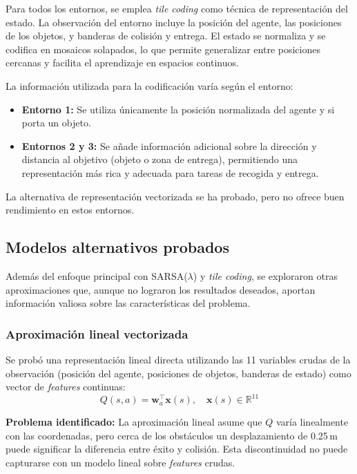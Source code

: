 \documentclass[a4paper,12pt]{article}
\begin{document}
Para todos los entornos, se emplea \textit{tile coding} como técnica de representación del estado. La observación del entorno incluye la posición del agente, las posiciones de los objetos, y banderas de colisión y entrega. El estado se normaliza y se codifica en mosaicos solapados, lo que permite generalizar entre posiciones cercanas y facilita el aprendizaje en espacios continuos.

La información utilizada para la codificación varía según el entorno:
\begin{itemize}
    \item \textbf{Entorno 1:} Se utiliza únicamente la posición normalizada del agente y si porta un objeto.
    \item \textbf{Entornos 2 y 3:} Se añade información adicional sobre la dirección y distancia al objetivo (objeto o zona de entrega), permitiendo una representación más rica y adecuada para tareas de recogida y entrega.
\end{itemize}

La alternativa de representación vectorizada se ha probado, pero no ofrece buen rendimiento en estos entornos.

\subsection{Modelos alternativos probados}

Además del enfoque principal con SARSA($\lambda$) y \textit{tile coding}, se exploraron otras aproximaciones que, aunque no lograron los resultados deseados, aportan información valiosa sobre las características del problema.

\subsubsection{Aproximación lineal vectorizada}

Se probó una representación lineal directa utilizando las 11 variables crudas de la observación (posición del agente, posiciones de objetos, banderas de estado) como vector de \textit{features} continuas:
\[
Q(s,a) = \mathbf{w}_a^\top \mathbf{x}(s), \quad \mathbf{x}(s) \in \mathbb{R}^{11}
\]

\textbf{Problema identificado:} La aproximación lineal asume que $Q$ varía linealmente con las coordenadas, pero cerca de los obstáculos un desplazamiento de 0.25\,m puede significar la diferencia entre éxito y colisión. Esta discontinuidad no puede capturarse con un modelo lineal sobre \textit{features} crudas.
\end{document}
